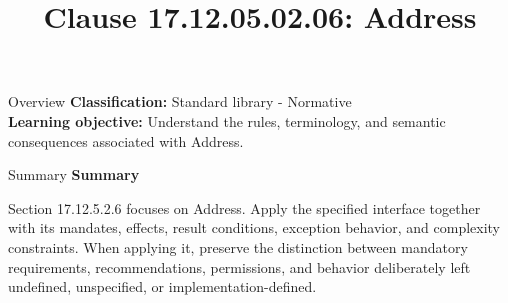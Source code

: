 \documentclass[10pt,letterpaper]{article}
\title{Clause 17.12.05.02.06: Address}
\author{}
\date{}
\begin{document}
\maketitle
\begin{CornellOverviewBox}{Overview}
\textbf{Classification:} Standard library - Normative\\[2pt]
\textbf{Learning objective:} Understand the rules, terminology, and semantic consequences associated with Address.
\end{CornellOverviewBox}\begin{CornellSummaryBox}{Summary}
{\sffamily\bfseries\color{Accent} Summary}\par\vspace{3pt}Section 17.12.5.2.6 focuses on Address. Apply the specified interface together with its mandates, effects, result conditions, exception behavior, and complexity constraints. When applying it, preserve the distinction between mandatory requirements, recommendations, permissions, and behavior deliberately left undefined, unspecified, or implementation-defined.
\end{CornellSummaryBox}
\end{document}
